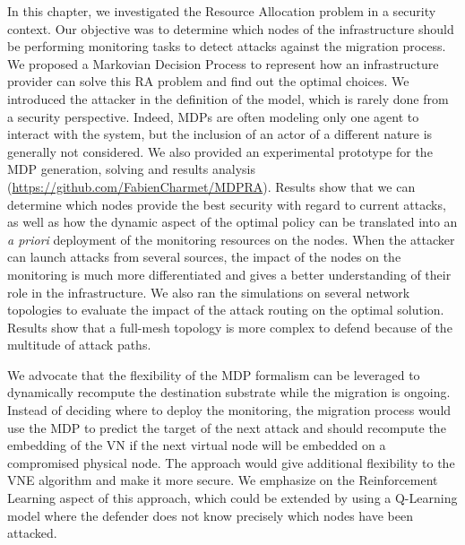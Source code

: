 \label{sec:mdp-conclusion}
In this chapter, we investigated the Resource Allocation problem in a security context. Our objective was to determine which nodes of the infrastructure should be performing monitoring tasks to detect attacks against the migration process.
We proposed a Markovian Decision Process to represent how an infrastructure provider can solve this RA problem and find out the optimal choices.
We introduced the attacker in the definition of the model, which is rarely done from a security perspective. Indeed, MDPs are often modeling only one agent to interact with the system, but the inclusion of an actor of a different nature is generally not considered.
We also provided an experimental prototype for the MDP generation, solving and results analysis  (\url{https://github.com/FabienCharmet/MDPRA}).
Results show that we can determine which nodes provide the best security with regard to current attacks, as well as how the dynamic aspect of the optimal policy can be translated into an \textit{a priori} deployment of the monitoring resources on the nodes.
When the attacker can launch attacks from several sources, the impact of the nodes on the monitoring is much more differentiated and gives a better understanding of their role in the infrastructure.
We also ran the simulations on several network topologies to evaluate the impact of the attack routing on the optimal solution. Results show that a full-mesh topology is more complex to defend because of the multitude of attack paths.

We advocate that the flexibility of the MDP formalism can be leveraged to dynamically recompute the destination substrate while the migration is ongoing.
Instead of deciding where to deploy the monitoring, the migration process would use the MDP to predict the target of the next attack and should recompute the embedding of the VN if the next virtual node will be embedded on a compromised physical node. The approach would give additional flexibility to the VNE algorithm and make it more secure. We emphasize on the Reinforcement Learning aspect of this approach, which could be extended by using a Q-Learning model where the defender does not know precisely which nodes have been attacked.

